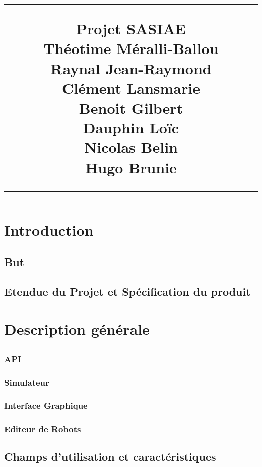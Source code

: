 \documentclass{scrreprt}
\title{%
\flushright
\rule{16cm}{5pt}
\vskip1cm
{\Huge Projet SASIAE}\\
\vspace{10cm}
{\small Théotime Méralli-Ballou\\ Raynal Jean-Raymond\\ Clément Lansmarie\\ Benoit Gilbert\\ Dauphin Loïc\\ Nicolas Belin\\ Hugo Brunie\\ }
\vfill
\rule{16cm}{5pt}
}
\date{}
\begin{document}
\maketitle
\tableofcontents

\chapter{Introduction}
\section{But}
\section{Etendue du Projet et Spécification du produit}

\chapter{Description générale}
\section{}
\subsection{API}

\subsection{Simulateur}

\subsection{Interface Graphique}

\subsection{Editeur de Robots}

\section{Champs d'utilisation et caractéristiques}
\end{document}
